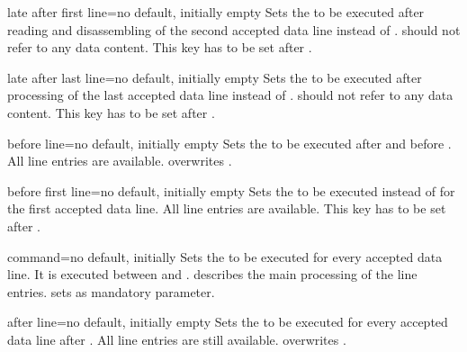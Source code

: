 \documentclass[a4paper,11pt]{ltxdoc}
\begin{document}
\begin{docCsvKey}{late after first line}{=}{no default, initially empty}
  Sets the  to be executed after reading and disassembling
  of the second accepted data line instead of .
   should not refer to any data content.
  This key has to be set after .
\end{docCsvKey}


\begin{docCsvKey}{late after last line}{=}{no default, initially empty}
  Sets the  to be executed after processing of the last
  accepted data line instead of .
   should not refer to any data content.
  This key has to be set after .
\end{docCsvKey}


\begin{docCsvKey}{before line}{=}{no default, initially empty}
  Sets the  to be executed after 
  and before .
  All line entries are available.
   overwrites
  .
\end{docCsvKey}


\begin{docCsvKey}{before first line}{=}{no default, initially empty}
  Sets the  to be executed instead of 
  for the first accepted data line.
  All line entries are available.
  This key has to be set after .
\end{docCsvKey}

\pagebreak

\begin{docCsvKey}{command}{=}{no default, initially }
  Sets the  to be executed for every accepted data line.
  It is executed between  and .
   describes the main processing of the line
  entries.  sets  as mandatory
  parameter.
\end{docCsvKey}

\begin{docCsvKey}{after line}{=}{no default, initially empty}
  Sets the  to be executed for every accepted data line
  after .
  All line entries are still available.
   overwrites .
\end{docCsvKey}
\end{document}
